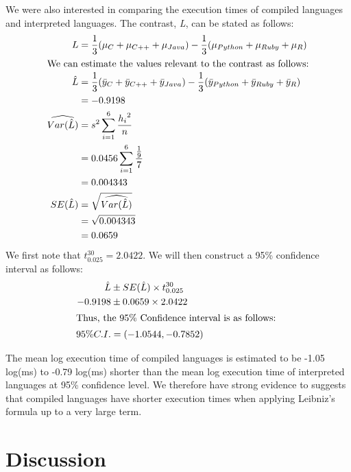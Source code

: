 \documentclass[12pt,halfline,a4paper,]{ouparticle}
\begin{document}
We were also interested in comparing the execution times of compiled
languages and interpreted languages. The contrast, \emph{L}, can be
stated as follows: \begin{align*}
L &= \frac{1}{3} (\mu_C + \mu_{C++} + \mu_{Java}) - \frac{1}{3}(\mu_{Python} + \mu_{Ruby} + \mu_{R})\\
\intertext{We can estimate the values relevant to the contrast as follows:}
\hat{L} &= \frac{1}{3} (\bar{y}_C + \bar{y}_{C++} + \bar{y}_{Java}) - \frac{1}{3}(\bar{y}_{Python} + \bar{y}_{Ruby} + \bar{y}_{R})\\
&= -0.9198 \\
\widehat{Var(\hat{L})} &= s^{2} \sum_{i=1}^{6} \frac{{h_i}^2}{n}\\
&= 0.0456\sum_{i=1}^{6}\frac{\frac{1}{9}}{7}\\
&= 0.004343\\
SE(\hat{L}) &= \sqrt{\widehat{Var(\hat{L})}}\\
 &= \sqrt{0.004343}\\
 &= 0.0659
\end{align*} We first note that \(t_{0.025}^{30} = 2.0422\). We will
then construct a 95\% confidence interval as follows: \begin{align*}
\hat{L}&\pm SE(\hat{L})\times t_{0.025}^{30}\\
-0.9198 &\pm 0.0659 \times 2.0422\\
\intertext{Thus, the 95\% Confidence interval is as follows: }
95\%C.I. &= (-1.0544 ,-0.7852)
\end{align*}

The mean log execution time of compiled languages is estimated to be
-1.05 log(ms) to -0.79 log(ms) shorter than the mean log execution time
of interpreted languages at 95\% confidence level. We therefore have
strong evidence to suggests that compiled languages have shorter
execution times when applying Leibniz's formula up to a very large term.
\newpage

\hypertarget{discussion}{%
\section{Discussion}\label{discussion}}
\end{document}
